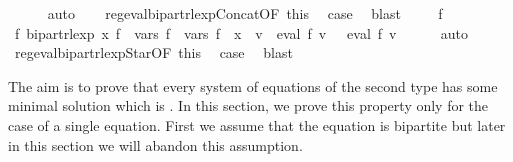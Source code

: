 \begin{isabellebody}
\ \ \ \ \isamarkupfalse%
\ auto\isanewline
\ \ \isamarkupfalse%
\ reg{\isacharunderscore}{\kern0pt}eval{\isacharunderscore}{\kern0pt}bipart{\isacharunderscore}{\kern0pt}rlexp{\isacharunderscore}{\kern0pt}Concat{\isacharbrackleft}{\kern0pt}OF\ this{\isacharbrackright}{\kern0pt}\ \isamarkupfalse%
\ {\isacharquery}{\kern0pt}case\ \isamarkupfalse%
\ blast\isanewline
{}\isamarkupfalse%
\isanewline
\ \ \isamarkupfalse%
\ {\isacharparenleft}{\kern0pt}{}\ f{\isacharparenright}{\kern0pt}\isanewline
\ \ \isamarkupfalse%
\ \isamarkupfalse%
\ {\isachardoublequoteopen}{\isasymexists}f{\isacharprime}{\kern0pt}{\isachardot}{\kern0pt}\ bipart{\isacharunderscore}{\kern0pt}rlexp\ x\ f{\isacharprime}{\kern0pt}\ {\isasymand}\ vars\ f{\isacharprime}{\kern0pt}\ {\isacharequal}{\kern0pt}\ vars\ f\ {\isasymunion}\ {\isacharbraceleft}{\kern0pt}x{\isacharbraceright}{\kern0pt}\ {\isasymand}\ {\isacharparenleft}{\kern0pt}{\isasymforall}v{\isachardot}{\kern0pt}\ {\isasymPsi}\ {\isacharparenleft}{\kern0pt}eval\ f\ v{\isacharparenright}{\kern0pt}\ {\isacharequal}{\kern0pt}\ {\isasymPsi}\ {\isacharparenleft}{\kern0pt}eval\ f{\isacharprime}{\kern0pt}\ v{\isacharparenright}{\kern0pt}{\isacharparenright}{\kern0pt}{\isachardoublequoteclose}\isanewline
\ \ \ \ \isamarkupfalse%
\ auto\isanewline
\ \ \isamarkupfalse%
\ reg{\isacharunderscore}{\kern0pt}eval{\isacharunderscore}{\kern0pt}bipart{\isacharunderscore}{\kern0pt}rlexp{\isacharunderscore}{\kern0pt}Star{\isacharbrackleft}{\kern0pt}OF\ this{\isacharbrackright}{\kern0pt}\ \isamarkupfalse%
\ {\isacharquery}{\kern0pt}case\ \isamarkupfalse%
\ blast\isanewline
{}\isamarkupfalse%
%
\endisatagproof
{\isafoldproof}%
%
\isadelimproof
%
\endisadelimproof
%
\isadelimdocument
%
\endisadelimdocument
%
\isatagdocument
%
\isamarkuptrue%
%
\endisatagdocument
{\isafolddocument}%
%
\isadelimdocument
%
\endisadelimdocument
%
\begin{isamarkuptext}%
The aim is to prove that every system of  equations of the second type
has some minimal solution which is . In this section, we prove this property
only for the case of a single equation. First we assume that the equation is bipartite but later
in this section we will abandon this assumption.%

\end{isamarkuptext}
\end{isabellebody}
